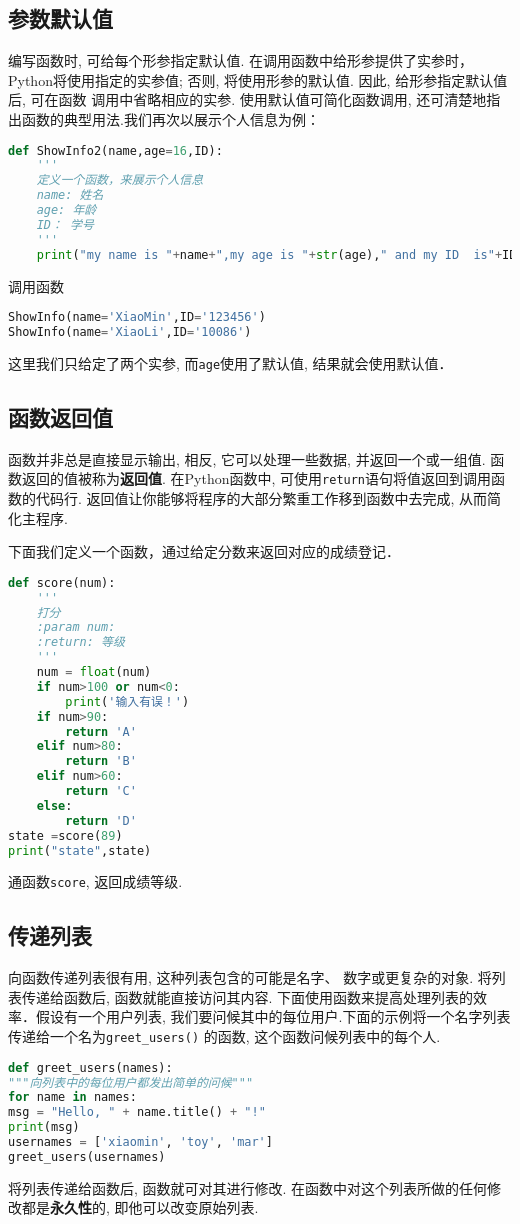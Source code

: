 \subsection{参数默认值}
编写函数时, 可给每个形参指定默认值. 在调用函数中给形参提供了实参时， Python将使用指定的实参值; 否则, 将使用形参的默认值. 因此, 给形参指定默认值后, 可在函数
调用中省略相应的实参. 使用默认值可简化函数调用, 还可清楚地指出函数的典型用法.我们再次以展示个人信息为例：
\begin{lstlisting}[language=python]
def ShowInfo2(name,age=16,ID):
    '''
    定义一个函数，来展示个人信息
    name: 姓名
    age: 年龄
    ID： 学号
    '''
    print("my name is "+name+",my age is "+str(age)," and my ID  is"+ID)
\end{lstlisting}
调用函数
\begin{lstlisting}[language=python]
ShowInfo(name='XiaoMin',ID='123456')
ShowInfo(name='XiaoLi',ID='10086')
\end{lstlisting}
这里我们只给定了两个实参, 而\verb|age|使用了默认值, 结果就会使用默认值．

\subsection{函数返回值}
函数并非总是直接显示输出, 相反, 它可以处理一些数据, 并返回一个或一组值. 函数返回的值被称为\textbf{返回值}. 在Python函数中, 可使用\verb|return|语句将值返回到调用函数的代码行. 返回值让你能够将程序的大部分繁重工作移到函数中去完成, 从而简化主程序.

下面我们定义一个函数，通过给定分数来返回对应的成绩登记．
\begin{lstlisting}[language=python]
def score(num):
    '''
    打分
    :param num:
    :return: 等级
    '''
    num = float(num)
    if num>100 or num<0:
        print('输入有误！')
    if num>90:
        return 'A'
    elif num>80:
        return 'B'
    elif num>60:
        return 'C'
    else:
        return 'D'
state =score(89)
print("state",state)
\end{lstlisting}
通函数\verb|score|, 返回成绩等级.

\subsection{传递列表}
向函数传递列表很有用, 这种列表包含的可能是名字、 数字或更复杂的对象. 将列表传递给函数后, 函数就能直接访问其内容. 下面使用函数来提高处理列表的效率．假设有一个用户列表, 我们要问候其中的每位用户.下面的示例将一个名字列表传递给一个名为\verb|greet_users()| 的函数, 这个函数问候列表中的每个人.
\begin{lstlisting}[language=python]
def greet_users(names):
"""向列表中的每位用户都发出简单的问候"""
for name in names:
msg = "Hello, " + name.title() + "!"
print(msg)
usernames = ['xiaomin', 'toy', 'mar']
greet_users(usernames)
\end{lstlisting}
将列表传递给函数后, 函数就可对其进行修改. 在函数中对这个列表所做的任何修改都是\textbf{永久性}的, 即他可以改变原始列表.

